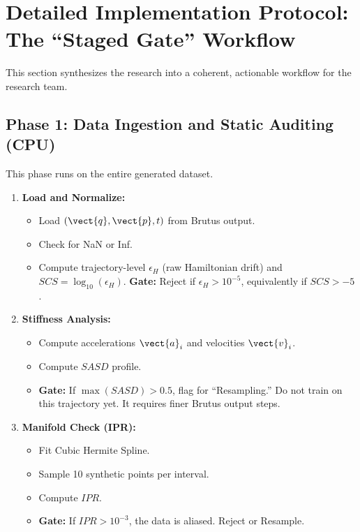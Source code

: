 \section{Detailed Implementation Protocol: The ``Staged Gate'' Workflow}

This section synthesizes the research into a coherent, actionable workflow for the research team.

\subsection{Phase 1: Data Ingestion and Static Auditing (CPU)}
This phase runs on the entire generated dataset.

\begin{enumerate}
    \item \textbf{Load and Normalize:}
    \begin{itemize}
        \item Load $(\vect{q}, \vect{p}, t)$ from Brutus output.
        \item Check for NaN or Inf.
        \item Compute trajectory-level $\epsilon_H$ (raw Hamiltonian drift) and $SCS = \log_{10}(\epsilon_H)$. \textbf{Gate:} Reject if $\epsilon_H > 10^{-5}$, equivalently if $SCS > -5$.
    \end{itemize}
    \item \textbf{Stiffness Analysis:}
    \begin{itemize}
        \item Compute accelerations $\vect{a}_i$ and velocities $\vect{v}_i$.
        \item Compute $SASD$ profile.
        \item \textbf{Gate:} If $\max(SASD) > 0.5$, flag for ``Resampling.'' Do not train on this trajectory yet. It requires finer Brutus output steps.
    \end{itemize}
    \item \textbf{Manifold Check (IPR):}
    \begin{itemize}
        \item Fit Cubic Hermite Spline.
        \item Sample 10 synthetic points per interval.
        \item Compute $IPR$.
        \item \textbf{Gate:} If $IPR > 10^{-3}$, the data is aliased. Reject or Resample.
    \end{itemize}
\end{enumerate}

